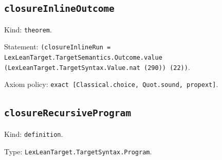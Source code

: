 \documentclass[11pt]{article}
\begin{document}
\subsection*{\texttt{closureInlineOutcome}}
\noindent Kind: \texttt{theorem}.\par
\noindent Statement: \texttt{(closureInlineRun = LexLeanTarget.TargetSemantics.Outcome.value (LexLeanTarget.TargetSyntax.Value.nat (290)) (22))}.\par
\noindent Axiom policy: \texttt{exact [Classical.choice, Quot.sound, propext]}.\par
\subsection*{\texttt{closureRecursiveProgram}}
\noindent Kind: \texttt{definition}.\par
\noindent Type: \texttt{LexLeanTarget.TargetSyntax.Program}.\par
\end{document}
